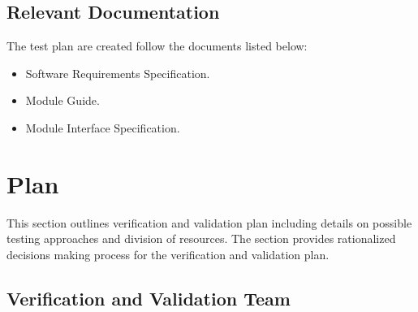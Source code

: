 \documentclass[12pt, titlepage]{article}
\begin{document}
\subsection{Relevant Documentation}
The test plan are created follow the documents listed below:
\begin{itemize}
    \item Software Requirements Specification.
    \item Module Guide.
    \item Module Interface Specification.
\end{itemize}




\section{Plan}

  
This section outlines verification and validation plan including details on possible testing approaches and division of resources. The section provides rationalized decisions making process for the verification and validation plan.

\subsection{Verification and Validation Team}
\end{document}
